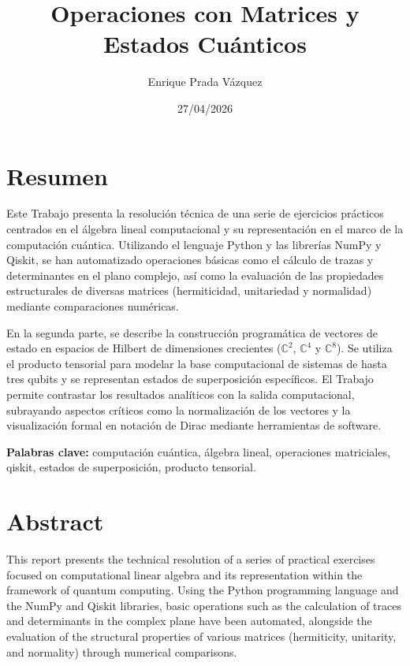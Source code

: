 \documentclass[11pt,a4paper,spanish]{book}
\title{Operaciones con Matrices y Estados Cuánticos}
\author{Enrique Prada Vázquez}
\date{27/04/2026}
\begin{document}
\renewcommand{\listfigurename}{Índice de figuras}
\renewcommand{\listtablename}{Índice de tablas}
\renewcommand{\contentsname}{Índice de contenidos}
\renewcommand{\figurename}{Figura}
\renewcommand{\tablename}{Tabla} 

\maketitle
\frontmatter
\tableofcontents
\listoftables

\chapter{Resumen}
Este Trabajo presenta la resolución técnica de una serie de ejercicios prácticos centrados en el álgebra lineal computacional y su representación en el marco de la computación cuántica. Utilizando el lenguaje Python y las librerías NumPy y Qiskit, se han automatizado operaciones básicas como el cálculo de trazas y determinantes en el plano complejo, así como la evaluación de las propiedades estructurales de diversas matrices (hermiticidad, unitariedad y normalidad) mediante comparaciones numéricas. 

En la segunda parte, se describe la construcción programática de vectores de estado en espacios de Hilbert de dimensiones crecientes ($\mathbb{C}^2$, $\mathbb{C}^4$ y $\mathbb{C}^8$). Se utiliza el producto tensorial para modelar la base computacional de sistemas de hasta tres qubits y se representan estados de superposición específicos. El Trabajo permite contrastar los resultados analíticos con la salida computacional, subrayando aspectos críticos como la normalización de los vectores y la visualización formal en notación de Dirac mediante herramientas de software.

\vspace{0.5cm}
{\bf Palabras clave:} computación cuántica, álgebra lineal, operaciones matriciales, qiskit, estados de superposición, producto tensorial.

\chapter{Abstract}
This report presents the technical resolution of a series of practical exercises focused on computational linear algebra and its representation within the framework of quantum computing. Using the Python programming language and the NumPy and Qiskit libraries, basic operations such as the calculation of traces and determinants in the complex plane have been automated, alongside the evaluation of the structural properties of various matrices (hermiticity, unitarity, and normality) through numerical comparisons.
\end{document}
